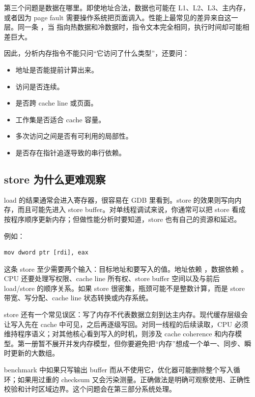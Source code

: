 第三个问题是数据在哪里。即使地址合法，数据也可能在 L1、L2、L3、主内存，或者因为 page fault 需要操作系统把页面调入。性能上最常见的差异来自这一层。同一条 ，当  指向热数据和冷数据时，指令文本完全相同，执行时间却可能相差巨大。

因此，分析内存指令不能只问“它访问了什么类型”，还要问：

\begin{itemize}
  \item 地址是否能提前计算出来。
  \item 访问是否连续。
  \item 是否跨 cache line 或页面。
  \item 工作集是否适合 cache 容量。
  \item 多次访问之间是否有可利用的局部性。
  \item 是否存在指针追逐导致的串行依赖。
\end{itemize}

\subsection{store 为什么更难观察}

load 的结果通常会进入寄存器，很容易在 GDB 里看到。store 的效果则写向内存，而且可能先进入 store buffer。对单线程调试来说，你通常可以把 store 看成按程序顺序更新内存；但做性能分析时要知道，store 也有自己的资源和延迟。

例如：

\begin{lstlisting}
mov dword ptr [rdi], eax
\end{lstlisting}

这条 store 至少需要两个输入：目标地址和要写入的值。地址依赖 ，数据依赖 。CPU 还要处理写权限、cache line 所有权、store buffer 空间以及与前后 load/store 的顺序关系。如果 store 很密集，瓶颈可能不是整数计算，而是 store 带宽、写分配、cache line 状态转换或内存系统。

store 还有一个常见误区：写了内存不代表数据立刻到达主内存。现代缓存层级会让写入先在 cache 中可见，之后再逐级写回。对同一线程的后续读取，CPU 必须维持程序语义；对其他核心看到写入的时机，则涉及 cache coherence 和内存模型。第一册暂不展开并发内存模型，但你要避免把“内存”想成一个单一、同步、瞬时更新的大数组。

\begin{warningbox}
benchmark 中如果只写输出 buffer 而从不使用它，优化器可能删除整个写入循环；如果用过重的 checksum 又会污染测量。正确做法是明确可观察使用、正确性校验和计时区域边界。这个问题会在第三部分系统处理。
\end{warningbox}

